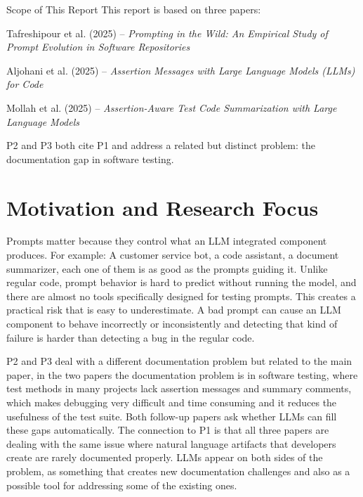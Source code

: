 \documentclass[
    pdftex,
    final,
    11pt,
    a4paper,
    parskip=false,
    oneside,
    footheight=0mm,
    footinclude=false,
    toc=bibliography
]{scrbook}
\begin{document}
\begin{graybox}{Scope of This Report}
This report is based on three papers:
\begin{description}[style=multiline, labelindent=\parindent, leftmargin=\rqindent, itemsep=-1ex]
\item[P1] Tafreshipour et al. (2025) -- \emph{Prompting in the Wild: An Empirical Study of Prompt Evolution in Software Repositories} \cite{Tafreshipour2025}
\item[P2] Aljohani et al. (2025) -- \emph{Assertion Messages with Large Language Models (LLMs) for Code} \cite{Aljohani2025}
\item[P3] Mollah et al. (2025) -- \emph{Assertion-Aware Test Code Summarization with Large Language Models} \cite{Mollah2025}
\end{description}
P2 and P3 both cite P1 and address a related but distinct problem: the documentation gap in software testing.
\end{graybox}

\section{Motivation and Research Focus}

Prompts matter because they control what an LLM integrated component produces. For example: A customer service bot, a code assistant, a document summarizer, each one of them is as good as the prompts guiding it. Unlike regular code, prompt behavior is hard to predict without running the model, and there are almost no tools specifically designed for testing prompts. This creates a practical risk that is easy to underestimate. A bad prompt can cause an LLM component to behave incorrectly or inconsistently and detecting that kind of failure is harder than detecting a bug in the regular code.

P2 and P3 deal with a different documentation problem but related to the main paper, in the two papers the documentation problem is in software testing, where test methods in many projects lack assertion messages and summary comments, which makes debugging very difficult and time consuming and it reduces the usefulness of the test suite. Both follow-up papers ask whether LLMs can fill these gaps automatically. The connection to P1 is that all three papers are dealing with the same issue where natural language artifacts that developers create are rarely documented properly. LLMs appear on both sides of the problem, as something that creates new documentation challenges and also as a possible tool for addressing some of the existing ones.
\end{document}
